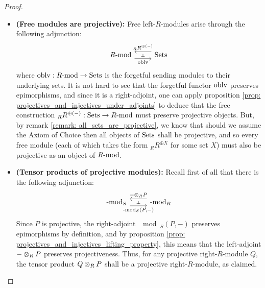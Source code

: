                 \begin{proof}
                    \noindent
                    \begin{itemize}
                        \item \textbf{(Free modules are projective):} Free left-$R$-modules arise through the following adjunction:
                            $$
                                \begin{tikzcd}
                                	{R\mod} & \Sets
                                	\arrow[""{name=0, anchor=center, inner sep=0}, "\oblv"', shift right=2, from=1-1, to=1-2]
                                	\arrow[""{name=1, anchor=center, inner sep=0}, "{{}_RR^{\oplus (-)}}"', shift right=2, from=1-2, to=1-1]
                                	\arrow["\dashv"{anchor=center, rotate=-90}, draw=none, from=1, to=0]
                                \end{tikzcd}
                            $$
                        where $\oblv: R\mod \to \Sets$ is the forgetful sending modules to their underlying sets. It is not hard to see that the forgetful functor $\oblv$ preserves epimorphisms, and since it is a right-adjoint, one can apply proposition \ref{prop: projectives_and_injectives_under_adjoints} to deduce that the free construction ${}_RR^{\oplus (-)}: \Sets \to R\mod$ must preserve projective objects. But, by remark \ref{remark: all_sets_are_projective}, we know that should we assume the Axiom of Choice then all objects of $\Sets$ shall be projective, and so every free module (each of which takes the form ${}_RR^{\oplus X}$ for some set $X$) must also be projective as an object of $R\mod$.
                        \item \textbf{(Tensor products of projective modules):} Recall first of all that there is the following adjunction:
                            $$
                               \begin{tikzcd}
                            	{\mod_S} & {\mod_R}
                            	\arrow[""{name=0, anchor=center, inner sep=0}, "{- \tensor_R P}"', shift right=2, from=1-2, to=1-1]
                            	\arrow[""{name=1, anchor=center, inner sep=0}, "{\mod_S(P, -)}"', shift right=2, from=1-1, to=1-2]
                            	\arrow["\dashv"{anchor=center, rotate=-90}, draw=none, from=0, to=1]
                            \end{tikzcd}
                            $$
                        Since $P$ is projective, the right-adjoint $\mod_S(P, -)$ preserves epimorphisms by definition, and by proposition \ref{prop: projectives_and_injectives_lifting_property}, this means that the left-adjoint $- \tensor_R P$ preserves projectiveness. Thus, for any projective right-$R$-module $Q$, the tensor product $Q \tensor_R P$ shall be a projective right-$R$-module, as claimed.
                    \end{itemize}
                \end{proof}
            
